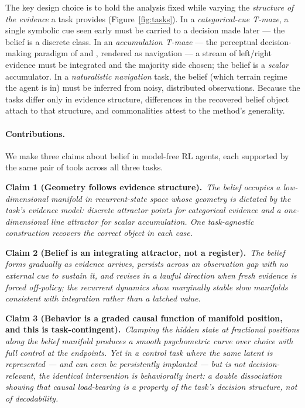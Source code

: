 \documentclass[11pt]{article}
\newcommand{\claim}[2]{\smallskip\noindent\textbf{Claim #1.}\ \emph{#2}\smallskip}
\begin{document}
The key design choice is to hold the analysis fixed while varying the
\emph{structure of the evidence} a task provides (Figure~\ref{fig:tasks}). In a
\emph{categorical-cue T-maze}, a single symbolic cue seen early must be carried to
a decision made later --- the belief is a discrete class. In an \emph{accumulation
T-maze} --- the perceptual decision-making paradigm of \citet{brunton2013rats} and
\citet{pinto2018towers}, rendered as navigation --- a stream of left/right
evidence must be integrated and the majority side chosen; the belief is a
\emph{scalar} accumulator. In a \emph{naturalistic navigation} task, the belief
(which terrain regime the agent is in) must be inferred from noisy, distributed
observations. Because the tasks differ only in evidence structure, differences in
the recovered belief object attach to that structure, and commonalities attest to
the method's generality.

\paragraph{Contributions.} We make three claims about belief in model-free RL
agents, each supported by the same pair of tools across all three tasks.

\claim{1 (Geometry follows evidence structure)}{The belief occupies a
low-dimensional manifold in recurrent-state space whose geometry is dictated by
the task's evidence model: discrete attractor points for categorical evidence and
a one-dimensional line attractor for scalar accumulation. One task-agnostic
construction recovers the correct object in each case.}

\claim{2 (Belief is an integrating attractor, not a register)}{The belief forms
gradually as evidence arrives, persists across an observation gap with no external
cue to sustain it, and revises in a lawful direction when fresh evidence is forced
off-policy; the recurrent dynamics show marginally stable slow manifolds
consistent with integration rather than a latched value.}

\claim{3 (Behavior is a graded causal function of manifold position, and this is
task-contingent)}{Clamping the hidden state at fractional positions along the
belief manifold produces a smooth psychometric curve over choice with full control
at the endpoints. Yet in a control task where the same latent is represented ---
and can even be persistently implanted --- but is not decision-relevant, the
identical intervention is behaviorally inert: a double dissociation showing that
causal load-bearing is a property of the task's decision structure, not of
decodability.}
\end{document}
